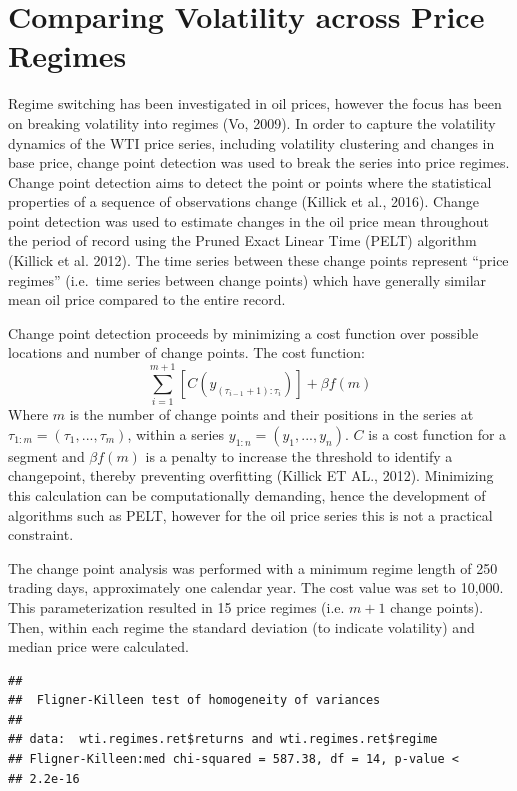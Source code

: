 \documentclass[]{article}
\begin{document}
\section{Comparing Volatility across Price
Regimes}\label{comparing-volatility-across-price-regimes}

Regime switching has been investigated in oil prices, however the focus
has been on breaking volatility into regimes (Vo, 2009). In order to
capture the volatility dynamics of the WTI price series, including
volatility clustering and changes in base price, change point detection
was used to break the series into price regimes. Change point detection
aims to detect the point or points where the statistical properties of a
sequence of observations change (Killick et al., 2016). Change point
detection was used to estimate changes in the oil price mean throughout
the period of record using the Pruned Exact Linear Time (PELT) algorithm
(Killick et al. 2012). The time series between these change points
represent ``price regimes'' (i.e.~time series between change points)
which have generally similar mean oil price compared to the entire
record.

Change point detection proceeds by minimizing a cost function over
possible locations and number of change points. The cost function:
\[\sum_{i=1}^{m+1}[C(y_{(\tau_{i-1}+1):\tau_i})]+\beta f(m) \] Where
\(m\) is the number of change points and their positions in the series
at \(\tau_{1:m}=(\tau_1,...,\tau_m)\), within a series
\(y_{1:n} = (y_1,...,y_n)\). \(C\) is a cost function for a segment and
\(\beta f(m)\) is a penalty to increase the threshold to identify a
changepoint, thereby preventing overfitting (Killick ET AL., 2012).
Minimizing this calculation can be computationally demanding, hence the
development of algorithms such as PELT, however for the oil price series
this is not a practical constraint.

The change point analysis was performed with a minimum regime length of
250 trading days, approximately one calendar year. The cost value was
set to 10,000. This parameterization resulted in 15 price regimes (i.e.
\(m+1\) change points). Then, within each regime the standard deviation
(to indicate volatility) and median price were calculated.

\begin{verbatim}
## 
##  Fligner-Killeen test of homogeneity of variances
## 
## data:  wti.regimes.ret$returns and wti.regimes.ret$regime
## Fligner-Killeen:med chi-squared = 587.38, df = 14, p-value <
## 2.2e-16
\end{verbatim}
\end{document}
